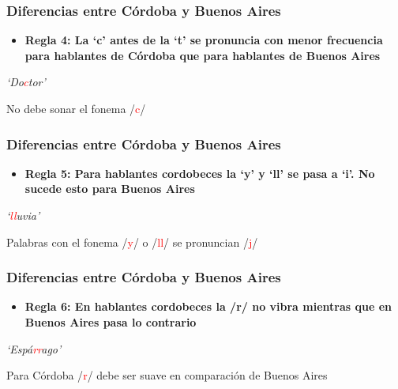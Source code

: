 \documentclass[mathserif]{beamer}%
\begin{document}
\begin{frame}
 	\frametitle{Diferencias entre Córdoba y Buenos Aires}
 	\begin{itemize}\itemsep=3ex
 		\item \textbf{Regla 4: La `c' antes de la `t' se pronuncia con menor frecuencia para hablantes de Córdoba que para hablantes de Buenos Aires} \\ 
 	\end{itemize}
 	
 	\begin{center}
 		\textit{`Do\textcolor{red}{c}tor'}
 	\end{center} 
 	
 	\begin{center}
 		No debe sonar el fonema /\textcolor{red}{c}/
 	\end{center}
\end{frame}

\begin{frame}
	\frametitle{Diferencias entre Córdoba y Buenos Aires}
	\begin{itemize}\itemsep=3ex
		\item \textbf{Regla 5: Para hablantes cordobeces la `y’ y `ll’ se pasa a `i’. No sucede esto para Buenos Aires} \\ 
	\end{itemize}
	
	\begin{center}
		\textit{`\textcolor{red}{ll}uvia'}
	\end{center} 
	
	\begin{center}
		Palabras con el fonema /\textcolor{red}{y}/ o /\textcolor{red}{ll}/ se pronuncian /\textcolor{red}{j}/
	\end{center}
\end{frame}
 
\begin{frame}
	\frametitle{Diferencias entre Córdoba y Buenos Aires}
	\begin{itemize}\itemsep=3ex
		\item \textbf{Regla 6: En hablantes cordobeces la /r/ no vibra mientras que en Buenos Aires pasa lo contrario} \\ 
	\end{itemize}	
	
	\begin{center}
		\textit{`Espá\textcolor{red}{rr}ago'}
	\end{center} 
	
	\begin{center}
		Para Córdoba /\textcolor{red}{r}/ debe ser suave en comparación de Buenos Aires
	\end{center}
\end{frame} 
\end{document}
